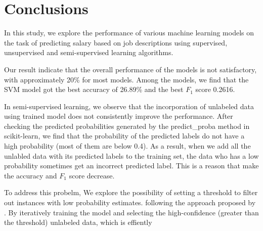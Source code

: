 \documentclass[11pt]{article}
\begin{document}
\section{Conclusions}

In this study, we explore the performance of various machine learning models on the task of predicting salary based on job descriptions using
supervised, unsupervised and semi-supervised learning algorithms.

Our result indicate that the overall performance of the models is not satisfactory,
with approximately 20\% for most models.
Among the models, we find that the SVM model got the best accuracy of 26.89\% and the best $F_1$ score 0.2616.

In semi-supervised learning, we observe that the incorporation of unlabeled data using trained model does not consistently improve the performance.
After checking the predicted probabilities generated by the predict\_proba method in scikit-learn,
we find that the probability of the predicted labels do not have a high probability (most of them are below 0.4).
As a result, when we add all the unlabled data with its predicted labels to the training set,
the data who has a low probability sometimes get an incorrect predicted label.
This is a reason that make the accuracy and $F_1$ score decrease.


To address this probelm, We explore the possibility of setting a threshold to filter out instances with low probability estimates.
following the approach proposed by \cite{Self-trained-semi-supervised-learning}.
By iteratively training the model and selecting the high-confidence (greater than the threshold) unlabeled data,
which is effiently 







\nocite{*}


\end{document}
